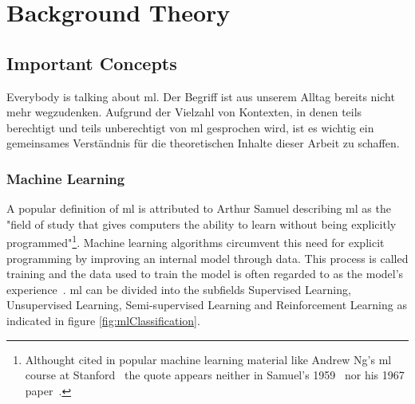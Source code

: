 \documentclass[
			   fontsize=11pt,
               paper=a4,
               bibliography=totoc,
               idxtotoc,
               headsepline,
               footsepline,
               footinclude=false,
               BCOR=12mm,
               DIV=13,
               openany,   %
               ]
               {scrbook}
\begin{document}
\chapter{Background Theory}

\section{Important Concepts}

Everybody is talking about \acrfull{ml}. Der Begriff ist aus unserem Alltag bereits nicht mehr wegzudenken. Aufgrund der Vielzahl von Kontexten, in denen teils berechtigt und teils unberechtigt von \acrfull{ml} gesprochen wird, ist es wichtig ein gemeinsames Verständnis für die theoretischen Inhalte dieser Arbeit zu schaffen. 

\subsection{Machine Learning}

A popular definition of \gls{ml} is attributed to Arthur Samuel describing \gls{ml} as the "field of study that gives computers the ability to learn without being explicitly programmed"\footnote{Althought cited in popular machine learning material like Andrew Ng's \gls{ml} course at Stanford~\cite{mlCourseStan} the quote appears neither in Samuel's 1959~\cite{mlQuote1959} nor his 1967 paper~\cite{mlQuote1967}.}. Machine learning algorithms circumvent this need for explicit programming by improving an internal model through data. This process is called training and the data used to train the model is often regarded to as the model's experience~\cite{mlMitchell}. \Gls{ml} can be divided into the subfields Supervised Learning, Unsupervised Learning, Semi-supervised Learning and Reinforcement Learning as indicated in figure \ref{fig:mlClassification}.
\end{document}
